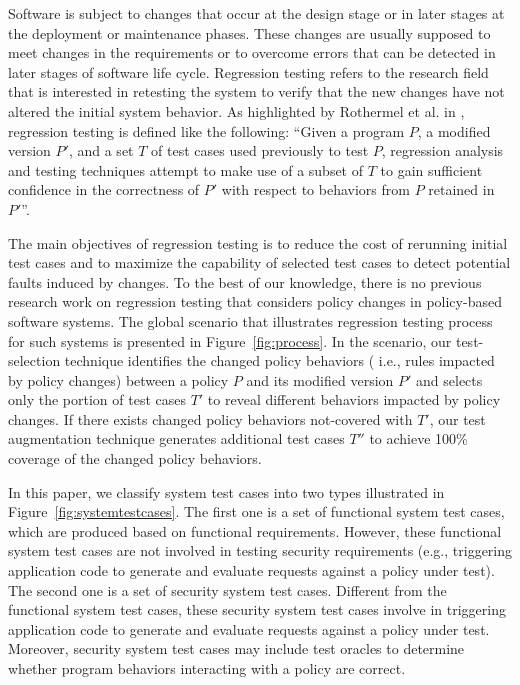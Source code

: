 Software is subject to changes that occur at the design stage or in later stages at the deployment or maintenance phases. These changes are 
usually supposed to meet changes in the requirements or to overcome errors that can be detected in later stages of software life cycle. 
Regression testing refers to the research field that is interested in retesting the system to verify that the new changes have not altered 
the initial system behavior. As highlighted by Rothermel et al. in \cite{Rothermel:1996:ART:235681.235682}, regression testing is defined like the 
following: 
``Given a program $P$, a modified version $P'$, and a set $T$ of test cases used previously to test $P$, regression analysis and testing 
techniques attempt to make use of a subset of $T$ to gain sufficient confidence in the correctness of $P'$ with respect to behaviors from $P$ retained 
in $P'$''.

The main objectives of regression testing is to reduce the cost of rerunning initial test cases and to maximize the capability of 
selected test cases to detect potential faults induced by changes.
To the best of our knowledge, there is no previous research work on regression testing that considers policy changes in policy-based software systems. 
The global scenario that illustrates regression testing process for such systems is presented in Figure~\ref{fig:process}.
In the scenario, our test-selection technique identifies the changed policy behaviors (
i.e., rules impacted by policy changes)
 between a policy $P$ and its modified version $P'$ and selects only the portion of test cases $T'$ to reveal different behaviors
impacted by policy changes. If there exists changed policy behaviors not-covered with $T'$, our test augmentation technique generates additional test cases $T''$  to achieve 100\% coverage of the changed policy behaviors.

In this paper, we classify system test cases into two types illustrated in Figure~\ref{fig:systemtestcases}.
The first one is a set of functional system test cases, which
are produced based on functional requirements. However, these functional
system test cases are not involved in testing security requirements (e.g., triggering application code to generate
and evaluate requests against a policy under test).
The second one is a set of security system test cases.
Different from the functional system test cases,
these security system test cases
involve in triggering application code to generate
and evaluate requests against a policy under test.
Moreover, security system test cases may include test oracles
to determine whether program behaviors interacting with a policy
are correct.


